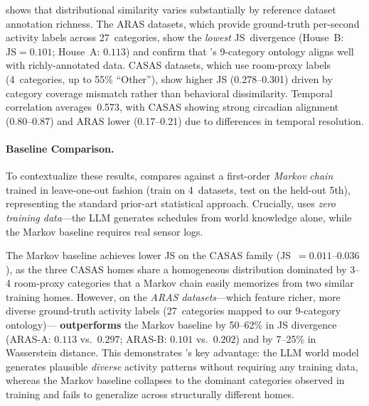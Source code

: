 

 shows that distributional similarity
varies substantially by reference dataset annotation richness.
The ARAS datasets, which provide ground-truth per-second activity
labels across 27~categories, show the \emph{lowest} JS~divergence
(House~B: $\text{JS}=0.101$; House~A: $0.113$) and confirm that
\sys{}'s 9-category ontology aligns well with richly-annotated
data.  CASAS datasets, which use room-proxy labels (4~categories,
up to 55\% ``Other''), show higher JS (0.278--0.301) driven by
category coverage mismatch rather than behavioral dissimilarity.
Temporal correlation averages~0.573, with CASAS showing strong
circadian alignment (0.80--0.87) and ARAS lower (0.17--0.21) due
to differences in temporal resolution.

\paragraph{Baseline Comparison.}



To contextualize these results, 
compares \sys{} against a first-order \emph{Markov
chain}~\cite{markov-activity} trained in leave-one-out fashion
(train on 4~datasets, test on the held-out 5th), representing
the standard prior-art statistical approach.  Crucially, \sys{}
uses \emph{zero training data}---the LLM generates schedules
from world knowledge alone, while the Markov baseline requires
real sensor logs.

The Markov baseline achieves lower JS on the CASAS family
(JS~$= 0.011\text{--}0.036$), as the three CASAS homes share a
homogeneous distribution dominated by 3--4 room-proxy categories
that a Markov chain easily memorizes from two similar training
homes.  However, on the \emph{ARAS datasets}---which feature
richer, more diverse ground-truth activity labels (27~categories
mapped to our 9-category ontology)---\sys{} \textbf{outperforms}
the Markov baseline by 50--62\% in JS divergence
(ARAS-A: $0.113$ vs.\ $0.297$; ARAS-B: $0.101$ vs.\ $0.202$)
and by 7--25\% in Wasserstein distance.
This demonstrates \sys{}'s key advantage: the LLM world model
generates plausible \emph{diverse} activity patterns without
requiring any training data, whereas the Markov baseline collapses
to the dominant categories observed in training and fails to
generalize across structurally different homes.



